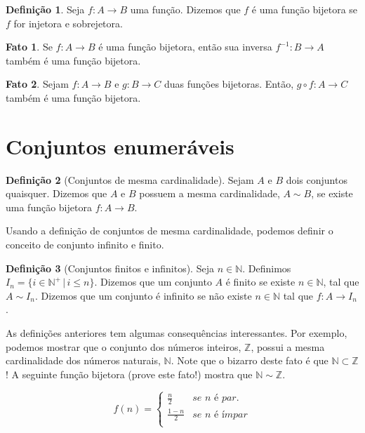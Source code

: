 \documentclass[a4paper]{article}
\theoremstyle{definition}
\newtheorem{Definition}{Definição}
\newtheorem{Fact}{Fato}
\begin{document}
  \begin{Definition}
    Seja $f : A\to B$ uma função. Dizemos que $f$ é uma função bijetora se $f$
    for injetora e sobrejetora.
  \end{Definition}

  \begin{Fact}
    Se $f : A \to B$ é uma função bijetora, então sua inversa $f^{-1} : B \to A$
    também é uma função bijetora.
  \end{Fact}

  \begin{Fact}
    Sejam $f : A \to B$ e $g : B \to C$ duas funções bijetoras. Então,
    $g \circ f : A \to C$ também é uma função bijetora.
  \end{Fact}
  
  
  \section{Conjuntos enumeráveis}

  \begin{Definition}[Conjuntos de mesma cardinalidade]
    Sejam $A$ e $B$ dois conjuntos quaisquer. Dizemos que $A$ e $B$ possuem
    a mesma cardinalidade, $A \sim B$, se existe uma função bijetora $f : A \to B$.
  \end{Definition}

  Usando a definição de conjuntos de mesma cardinalidade, podemos definir
  o conceito de conjunto infinito e finito.

  \begin{Definition}[Conjuntos finitos e infinitos]
    Seja $n \in \mathbb{N}$. Definimos $I_n =\{i \in \mathbb{N}^+\,|\, i \leq
    n\}$. Dizemos que um conjunto $A$ é finito se existe $n \in \mathbb{N}$, tal
    que $A \sim I_n$. Dizemos que um conjunto é infinito se não existe $n \in
    \mathbb{N}$ tal que $f : A \to I_n$.
  \end{Definition}

  As definições anteriores tem algumas consequências interessantes. Por exemplo,
  podemos mostrar que o conjunto dos números inteiros, $\mathbb{Z}$, possui a
  mesma cardinalidade dos números naturais, $\mathbb{N}$. Note que o bizarro
  deste fato é que $\mathbb{N} \subset \mathbb{Z}$! A seguinte função bijetora
  (prove este fato!) mostra que $\mathbb{N} \sim \mathbb{Z}$.

  \[
    f(n) = \left\{
      \begin{array}{ll}
        \frac{n}{2} & \textit{se }n\textit{ é par.}\\
        \frac{1 - n}{2} & \textit{se }n\textit{ é ímpar}\\
      \end{array}
           \right.
  \]
\end{document}
